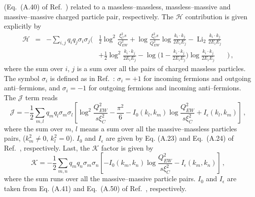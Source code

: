 \documentclass[11pt,a4paper]{article}
\DeclareMathOperator{\Li}{Li}
\begin{document}
(Eq.~(A.40) of Ref.~\cite{Alioli:2010xd}) related  to a massless--massless, massless--massive and massive--massive charged particle pair, 
respectively.
The $\mathcal{H}$ contribution is given explicitly by
\begin{equation}
\begin{array}{ccccc}
	\mathcal{H} & = & - \displaystyle\sum_{i,j} q_i q_j \sigma_i\sigma_j\Big(&\displaystyle\frac{1}{2}\log^2\displaystyle\frac{\xi_C^2s}{Q_{EW}^2}
															+\log\displaystyle\frac{\xi_C^2s}{Q_{EW}^2}\log\displaystyle\frac{k_i\cdot k_j}{2E_i E_j}
															-\Li_2\displaystyle\frac{k_i\cdot k_j}{2E_i E_j}&\\
			    &   &               & +\displaystyle\frac{1}{2}\log^2\displaystyle\frac{k_i\cdot k_j}{2E_i E_j} - \log\big(1 - \displaystyle\frac{k_i\cdot k_j}{2E_i E_j} 
			                               \big) \log\displaystyle\frac{k_i\cdot k_j}{2E_i E_j} &\Big) \, ,
\end{array}
\end{equation}
where the sum over $i$, $j$ is  a sum over all the pairs of charged
massless particles. The symbol $\sigma_i$ is defined as in Ref.~\cite{Dittmaier:1999mb}: $\sigma_i = +1$ 
for incoming fermions and outgoing anti--fermions, and $\sigma_i = -1$ for outgoing 
fermions and incoming anti--fermions. The $\mathcal{J}$ term reads
\begin{equation}
	\mathcal{J} = -\displaystyle\frac{1}{2}\sum_{m,l} q_m q_l \sigma_m\sigma_l\left[ \log^2\displaystyle\frac{Q_{EW}^2}{s\xi_C^2} - \displaystyle\frac{\pi^2}{6}
															- I_0(k_l,k_m) \log\displaystyle\frac{Q_{EW}^2}{s\xi^2_C} + I_\epsilon(k_l,k_m) \right] \, ,
\end{equation}
where the sum over $m$, $l$ means a sum over all the massive--massless 
particles pairs, ($k_m^2\neq 0$, $k_l^2=0$). $I_0$ and $I_\epsilon$ are given 
by Eq. (A.23) and Eq.~(A.24) of Ref.~\cite{Alioli:2010xd}, respectively. Last, the $\mathcal{K}$ factor is given by 
\begin{equation}
	\mathcal{K} = -\displaystyle\frac{1}{2}\sum_{m,n} q_m q_n \sigma_m\sigma_n\left[ - I_0(k_m,k_n)\log\frac{Q_{EW}^2}{s\xi^2_C} - I_\epsilon(k_m,k_n) \right] \, ,
\end{equation}
where the sum runs over all the massive--massive particle pairs. $I_0$ and $I_\epsilon$ are taken from Eq. (A.41) 
and Eq.~(A.50) of Ref.~\cite{Alioli:2010xd}, respectively.
\end{document}
